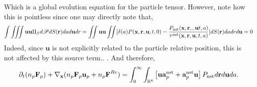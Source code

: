 Which is a global evolution equation for the particle tensor. 
However, note how this is pointless since one may directly note that, 
\begin{align*}
    \int\iiint \textbf{uu}\Pi_S  d\mathscr{P} dS(\textbf{r}) da d\textbf{u} dr =
    \iint \textbf{uu} 
    \iint [\delta(a)P(\textbf{x},\textbf{r},\textbf{u},t,0)
    - \frac{P_\text{nst}(\textbf{x},\textbf{r},,\textbf{u}t,a)}{\tau^\text{nst}(\textbf{x},\textbf{r},\textbf{u},t,a)}] dS(\textbf{r}) da
    dr d \textbf{u}
    = 0 
\end{align*}
Indeed, since $\textbf{u}$ is not explicitly related to the particle relative position, this is not affected by this source term.. . 
And therefore, 
\begin{equation*}
    \partial_t (n_p \textbf{F}_p )
    +{\mathbf{\nabla}_\textbf{x}} (n_p\textbf{F}_p \textbf{u}_p  + n_p \textbf{F}^{Re})
    = 
    \int_{0}^\infty
    \int_{\mathbb{R}^6} \left[
        \textbf{u} \textbf{a}^\text{nst}_p
        + \textbf{a}^\text{nst}_p\textbf{u}
    \right]P_\text{nst}
    d\textbf{r}
    d\textbf{u}
    da.
\end{equation*}

